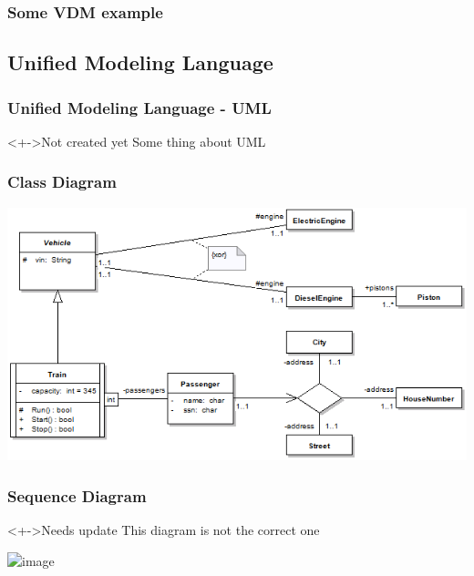 %
%
\frame
{
  \frametitle{Some VDM example}

\begin{center}


\end{center}
}

\subsection{Unified Modeling Language}
%
%
\frame
{
  \frametitle{Unified Modeling Language - UML}

\begin{center}

	\begin{block}<+->{Not created yet}
	Some thing about UML
	\end{block}

\end{center}
}


%
%
\frame
{
  \frametitle{Class Diagram}

\begin{center}

\includegraphics[width=\textwidth]{images/ClassDiagramOverview.png}

\end{center}
}

%
%
\frame
{
  \frametitle{Sequence Diagram}

	\begin{block}<+->{Needs update}
	This diagram is not the correct one
	\end{block}
\begin{center}
\includegraphics<1->[width=0.5\textwidth]{images/TracesSequenceDiagramEx2.png}%
\end{center}
}
